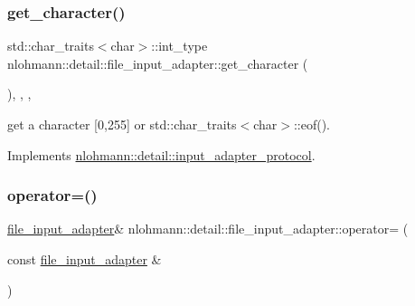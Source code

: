 \subsubsection{\texorpdfstring{get\_character()}{get\_character()}}
{\footnotesize\ttfamily std\+::char\+\_\+traits$<$char$>$\+::int\+\_\+type nlohmann\+::detail\+::file\+\_\+input\+\_\+adapter\+::get\+\_\+character (\begin{DoxyParamCaption}{ }\end{DoxyParamCaption})\hspace{0.3cm}{\ttfamily [inline]}, {\ttfamily [override]}, {\ttfamily [virtual]}, {\ttfamily [noexcept]}}



get a character \mbox{[}0,255\mbox{]} or std\+::char\+\_\+traits$<$char$>$\+::eof(). 



Implements \mbox{\hyperlink{structnlohmann_1_1detail_1_1input__adapter__protocol_aac10a6a4048a8ce8e2ed50277692a3ca}{nlohmann\+::detail\+::input\+\_\+adapter\+\_\+protocol}}.

\mbox{\label{classnlohmann_1_1detail_1_1file__input__adapter_ad59bbc7e3f23dd74475c5cb818784e42}} 
\subsubsection{\texorpdfstring{operator=()}{operator=()}\hspace{0.1cm}{\footnotesize\ttfamily [1/2]}}
{\footnotesize\ttfamily \mbox{\hyperlink{classnlohmann_1_1detail_1_1file__input__adapter}{file\+\_\+input\+\_\+adapter}}\& nlohmann\+::detail\+::file\+\_\+input\+\_\+adapter\+::operator= (\begin{DoxyParamCaption}\item[{const \mbox{\hyperlink{classnlohmann_1_1detail_1_1file__input__adapter}{file\+\_\+input\+\_\+adapter}} \&}]{ }\end{DoxyParamCaption})\hspace{0.3cm}{\ttfamily [delete]}}

\mbox{\label{classnlohmann_1_1detail_1_1file__input__adapter_a95adaec9a8c583a46083c4c493981e77}} 
